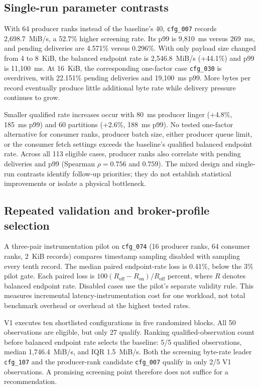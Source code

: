 \documentclass[10pt]{article}
\begin{document}
\subsection{Single-run parameter contrasts}

With 64 producer ranks instead of the baseline's 40, \texttt{cfg\_007} records
2,698.7~MiB/s, a 52.7\% higher screening rate. Its p99 is 9,810~ms
versus 269~ms, and pending deliveries are 4.571\% versus 0.296\%.
With only payload size changed from 4 to 8~KiB, the balanced endpoint rate is 2,546.8~MiB/s
(+44.1\%) and p99 is 11,100~ms. At 16~KiB, the corresponding one-factor
case \texttt{cfg\_030} is overdriven, with 22.151\% pending deliveries and
19,100~ms p99. More bytes per record eventually produce little additional
byte rate while delivery pressure continues to grow.

Smaller qualified rate increases occur with 80~ms producer linger
(+4.8\%, 185~ms p99) and 60 partitions (+2.6\%, 188~ms p99).
No tested one-factor alternative for consumer ranks, producer batch size,
either producer queue limit, or the consumer fetch settings exceeds the
baseline's qualified balanced endpoint rate. Across all 113 eligible cases, producer
ranks also correlate with pending deliveries and p99 (Spearman
$\rho=0.756$ and $0.759$). The mixed design and single-run contrasts identify
follow-up priorities; they do not establish statistical improvements or isolate
a physical bottleneck.

\subsection{Repeated validation and broker-profile selection}
\label{sec:profile-selection}

A three-pair instrumentation pilot on \texttt{cfg\_074} (16 producer ranks,
64 consumer ranks, 2~KiB records) compares timestamp sampling disabled with
sampling every tenth record.  The median paired endpoint-rate loss is 0.41\%,
below the 3\% pilot gate.  Each paired loss is $100(R_{\mathrm{off}}-R_{\mathrm{on}})/R_{\mathrm{off}}$
percent, where $R$ denotes balanced endpoint rate.  Disabled cases use the pilot's
separate validity rule.  This measures incremental latency-instrumentation cost for one
workload, not total benchmark overhead or overhead at the highest tested rates.

V1 executes ten shortlisted configurations in five randomized blocks.
All 50 observations are eligible, but only 27 qualify. Ranking qualified-observation
count before balanced endpoint rate selects the baseline: 5/5 qualified observations, median
1,746.4~MiB/s, and IQR 1.5~MiB/s. Both the screening byte-rate leader
\texttt{cfg\_107} and the producer-rank candidate \texttt{cfg\_007} qualify
in only 2/5 V1 observations. A promising screening point therefore does not suffice
for a recommendation.
\end{document}
